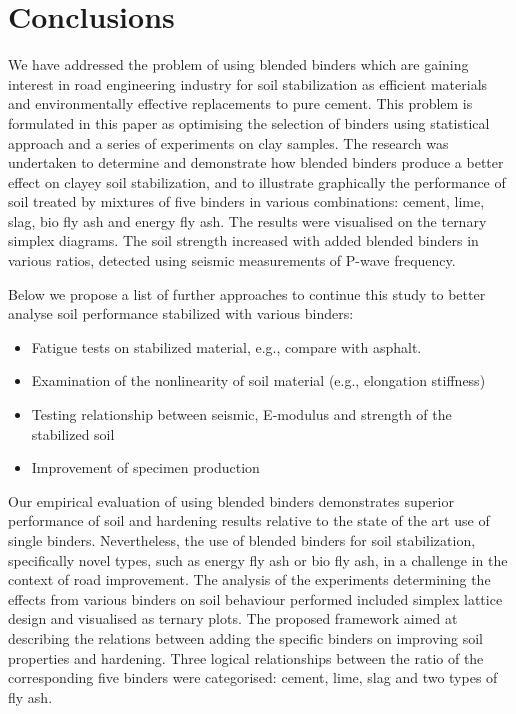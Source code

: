 \documentclass[constrmater,article,submit,pdftex,moreauthors]{Definitions/mdpi}
\begin{document}
\section{Conclusions}

We have addressed the problem of using blended binders which are gaining interest in road engineering industry for soil stabilization as efficient materials and environmentally effective replacements to pure cement. This problem is formulated in this paper as optimising the selection of binders using statistical approach and a series of experiments on clay samples. The research was undertaken to determine and demonstrate how blended binders produce a better effect on clayey soil stabilization, and to illustrate graphically the performance of soil treated by mixtures of five binders in various combinations: cement, lime, slag, bio fly ash and energy fly ash. The results were visualised on the ternary simplex diagrams. The soil strength increased with added blended binders in various ratios, detected using seismic measurements of P-wave frequency. 

Below we propose a list of further approaches to continue this study to better analyse soil performance stabilized with various binders:
\begin{itemize}
	\item	Fatigue tests on stabilized material, e.g., compare with asphalt. 
	\item Examination of the nonlinearity of soil material (e.g., elongation stiffness)
	\item Testing relationship between seismic, E-modulus and strength of the stabilized soil
	\item Improvement of specimen production
\end{itemize}

Our empirical evaluation of using blended binders demonstrates superior performance of soil and hardening results relative to the state of the art use of single binders. Nevertheless, the use of blended binders for soil stabilization, specifically novel types, such as energy fly ash or bio fly ash, in a challenge in the context of road improvement. The analysis of the experiments determining the effects from various binders on soil behaviour performed included simplex lattice design and visualised as ternary plots. The proposed framework aimed at describing the relations between adding the specific binders on improving soil properties and hardening. Three logical relationships between the ratio of the corresponding five binders were categorised: cement, lime, slag and two types of fly ash. 
\end{document}
